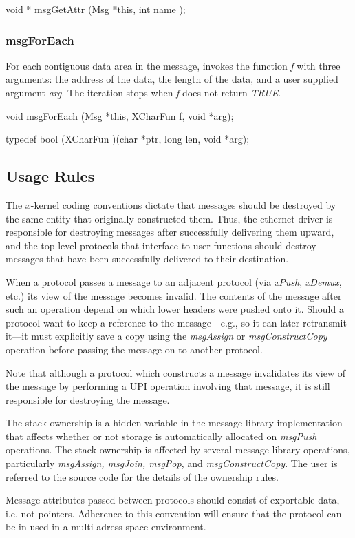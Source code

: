 {\sem void *} {\bold msgGetAttr} 
({\sem Msg} *{\caps this}, {\sem int} {\caps name} );

\subsubsection{msgForEach}

For each contiguous data area in the message, invokes the function {\em
f} with three arguments: the address of the data, the length of the
data, and a user supplied argument {\em arg}.  The iteration stops
when {\em f} does not return {\em TRUE}.
\medskip

{\sem void} {\bold msgForEach} ({\sem Msg} *{\caps this}, {\sem XCharFun} {\caps f}, {\sem void} *{\caps arg});
\medskip

{\sem typedef} {\sem  bool}  ({\bold *XCharFun} )({\sem char} *{\caps ptr}, {\sem long} {\caps len}, {\sem void} *{\caps arg});\\

\subsection{Usage Rules}
\label{msgusage}

The $x$-kernel coding conventions dictate that messages should be
destroyed by the same entity that originally constructed them.  Thus,
the ethernet driver is responsible for destroying messages after
successfully delivering them upward, and the top-level protocols that
interface to user functions should destroy messages that have been
successfully delivered to their destination.

When a protocol passes
a message to an adjacent protocol (via {\em xPush}, {\em
xDemux}, etc.) its view of the message becomes invalid.
The contents of the message after such an operation depend on
which lower headers were pushed onto it.  Should a protocol want to
keep a reference to the message---e.g., so it can later retransmit
it---it must explicitly save a copy using the {\em msgAssign} or {\em
msgConstructCopy} operation before passing the message on to another
protocol.

Note that although a protocol which constructs a message invalidates
its view of the message by performing a UPI operation involving
that message, it is still responsible for destroying the message. 

The stack ownership is a hidden variable in the message library
implementation that affects whether or not storage is automatically
allocated on {\em msgPush} operations.  The stack ownership is
affected by several message library operations, particularly
{\em msgAssign, msgJoin, msgPop}, and {\em msgConstructCopy}.
The user is referred to the source code for the details of the
ownership rules.

Message attributes passed between protocols should consist of
exportable data, i.e. not pointers.  Adherence to this convention will
ensure that the protocol can be in used in a multi-adress space
environment.
